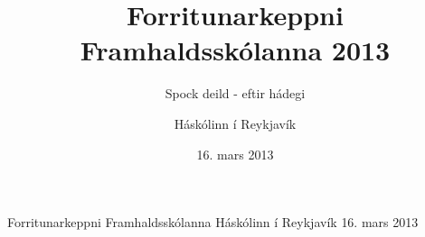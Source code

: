\documentclass[11pt,a4paper,oneside]{article}
\title{Forritunarkeppni Framhaldsskólanna 2013}
\subtitle{Spock deild - eftir hádegi}
\date{16. mars 2013}
\author{Háskólinn í Reykjavík}
\newcommand{\problemstatement}[1]{  }
\begin{document}

	\maketitle
	\thispagestyle{empty}
	\pagebreak

	\contest
	{Forritunarkeppni Framhaldsskólanna}%
	{Háskólinn í Reykjavík}%
	{16. mars 2013}%


	\setcounter{problem}{10}
	
	\problemstatement{Sort}
	\problemstatement{Thyngdarflokkur}
	\problemstatement{Breytunafn}
	\problemstatement{SamliggjandiTolur}
	\problemstatement{Margfoldun}
	\problemstatement{Sqrt}
	\problemstatement{BefungeLoop}
	\problemstatement{FostudagurinnThrettandi}
	\problemstatement{Maurar}
	\problemstatement{Pyramidi}
\end{document}
